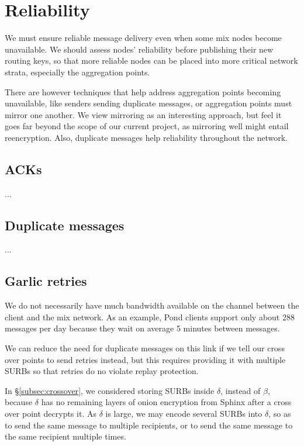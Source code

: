 
\section{Reliability}

We must ensure reliable message delivery even when some mix nodes
become unavailable.  We should assess nodes' reliability before
publishing their new routing keys, so that more reliable nodes can
be placed into more critical network strata, especially the
aggregation points.

There are however techniques that help address aggregation points
becoming unavailable, like senders sending duplicate messages,
 or aggregation points must mirror one another.
We view mirroring as an interesting approach, but feel it goes far
beyond the scope of our current project, as mirroring well might
entail reencryption.  Also, duplicate messages help reliability
throughout the network.


\subsection{ACKs}

...


\subsection{Duplicate messages}

...


\subsection{Garlic retries}\label{subsec:garlic_retries}

We do not necessarily have much bandwidth available on the channel
between the client and the mix network.  As an example, Pond clients
support only about 288 messages per day because they wait on average
5 minutes between messages.

We can reduce the need for duplicate messages on this link if
we tell our cross over points to send retries instead, but this
requires providing it with multiple SURBs so that retries do no
violate replay protection.

In \S\ref{subsec:crossover}, we considered storing SURBs inside
$\delta$, instead of $\beta$, because $\delta$ has no remaining layers
of onion encryption from Sphinx after a cross over point decrypts it. 
As $\delta$ is large, we may encode several SURBs into $\delta$,
so as to send the same message to multiple recipients, or to send
the same message to the same recipient multiple times.  

